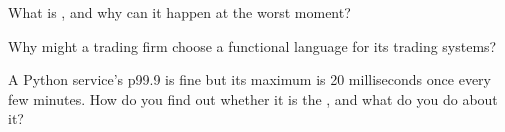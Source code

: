 \begin{interviewq}\label{iq:ll:managed-and-functional-languages-on-the-desk:4}
What is , and why can it happen at the worst moment?
\end{interviewq}

\begin{interviewq}\label{iq:ll:managed-and-functional-languages-on-the-desk:5}
Why might a trading firm choose a functional language for its trading systems?
\end{interviewq}

\begin{interviewq}\label{iq:ll:managed-and-functional-languages-on-the-desk:6}
A Python service's p99.9 is fine but its maximum is 20 milliseconds once every few minutes. How do you find out whether it is
the , and what do you do about it?
\end{interviewq}
